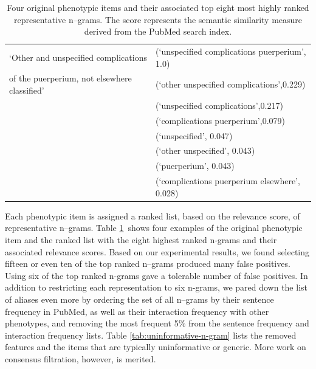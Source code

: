 \documentclass{sig-alternate-05-2015}
\begin{document}
\begin{table}
\begin{center}
\begin{tabular}{l l}
\hline
`Other and unspecified complications & (`unspecified complications puerperium', 1.0)\\
of the puerperium, not elsewhere classified'  &  (`other unspecified complications',0.229)\\
								& (`unspecified complications',0.217)\\
								&  (`complications puerperium',0.079)\\
								& (`unspecified', 0.047)\\
								& (`other unspecified', 0.043) \\
								& (`puerperium', 0.043) \\
								& (`complications puerperium elsewhere', 0.028) \\ 
\bottomrule
\end{tabular}
\end{center}
\caption{Four original phenotypic items and their associated top eight most highly ranked representative n--grams. The score represents the semantic similarity measure derived from the PubMed search index.}
\label{tab:pheno-n-gram}
\end{table}

Each phenotypic item is assigned a ranked list, based on the relevance score, of representative n--grams.
Table \ref{tab:pheno-n-gram}~shows four examples of the original phenotypic item and the ranked list with the eight  highest ranked n-grams and their associated relevance scores.
Based on our experimental results, we found selecting fifteen or even ten of the top ranked n--grams produced many false positives. Using six of the top ranked n-grams gave a tolerable number of false positives.
In addition to restricting each representation to six n-grams, we pared down the list of aliases even more by ordering the set of all n--grams by their sentence frequency in PubMed, as well as their interaction frequency with other phenotypes, and removing the most frequent 5\% from the sentence frequency and interaction frequency lists.
Table \ref{tab:uninformative-n-gram} lists the removed features and the items that are typically uninformative or generic.
More work on consensus filtration, however, is merited.
\end{document}
